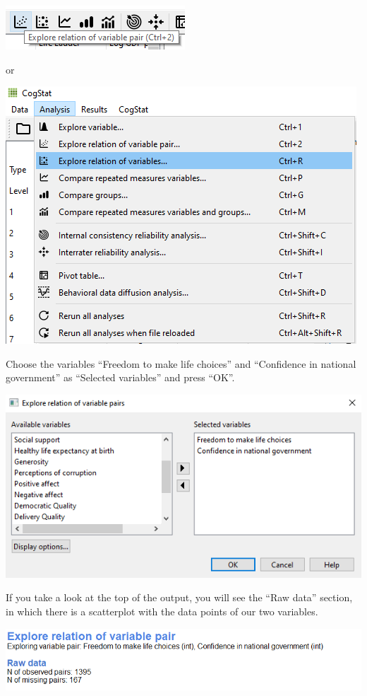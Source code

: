 \documentclass[
]{book}
\begin{document}
\includegraphics{img/ch3/variablepair.png}

or

\includegraphics{img/ch3/variablepair2.png}

Choose the variables ``Freedom to make life choices'' and ``Confidence in national government'' as ``Selected variables'' and press ``OK''.

\includegraphics{img/ch3/variablepair3.png}

If you take a look at the top of the output, you will see the ``Raw data'' section, in which there is a scatterplot with the data points of our two variables.

\includegraphics{img/ch3/vpraw.png}
\end{document}
